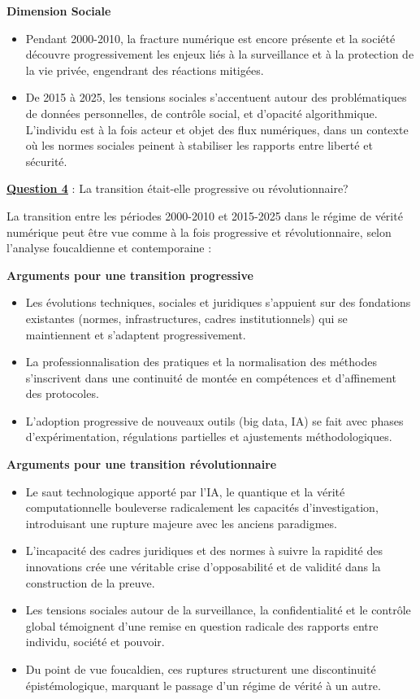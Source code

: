 \documentclass[12pt, a4paper]{article}
\newcommand{\question}[1]{\textbf{\underline{Question #1}}}
\begin{document}
\begin{enumerate}[label=\textbf{\arabic*.}]
		\textbf{Dimension Sociale}
		\begin{itemize}
			\item Pendant 2000-2010, la fracture numérique est encore présente et la société découvre progressivement les enjeux liés à la surveillance et à la protection de la vie privée, engendrant des réactions mitigées.
			\item De 2015 à 2025, les tensions sociales s'accentuent autour des problématiques de données personnelles, de contrôle social, et d'opacité algorithmique. L'individu est à la fois acteur et objet des flux numériques, dans un contexte où les normes sociales peinent à stabiliser les rapports entre liberté et sécurité.
		\end{itemize}
		
		\question{4} : La transition était-elle progressive ou révolutionnaire?
		
		La transition entre les périodes 2000-2010 et 2015-2025 dans le régime de vérité numérique peut être vue comme à la fois progressive et révolutionnaire, selon l'analyse foucaldienne et contemporaine :
		
		\textbf{Arguments pour une transition progressive}
		\begin{itemize}
			\item Les évolutions techniques, sociales et juridiques s'appuient sur des fondations existantes (normes, infrastructures, cadres institutionnels) qui se maintiennent et s'adaptent progressivement.
			\item La professionnalisation des pratiques et la normalisation des méthodes s'inscrivent dans une continuité de montée en compétences et d'affinement des protocoles.
			\item L'adoption progressive de nouveaux outils (big data, IA) se fait avec phases d'expérimentation, régulations partielles et ajustements méthodologiques.
		\end{itemize}
		
		\textbf{Arguments pour une transition révolutionnaire}
		\begin{itemize}
			\item Le saut technologique apporté par l'IA, le quantique et la vérité computationnelle bouleverse radicalement les capacités d'investigation, introduisant une rupture majeure avec les anciens paradigmes.
			\item L'incapacité des cadres juridiques et des normes à suivre la rapidité des innovations crée une véritable crise d'opposabilité et de validité dans la construction de la preuve.
			\item Les tensions sociales autour de la surveillance, la confidentialité et le contrôle global témoignent d'une remise en question radicale des rapports entre individu, société et pouvoir.
			\item Du point de vue foucaldien, ces ruptures structurent une discontinuité épistémologique, marquant le passage d'un régime de vérité à un autre.
		\end{itemize}
		

\end{enumerate}
\end{document}
